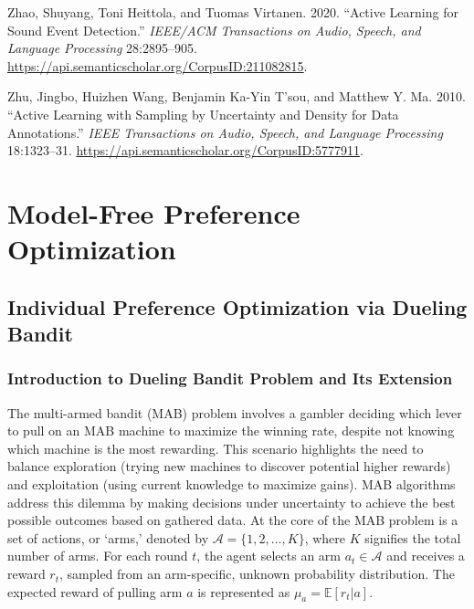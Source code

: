 \documentclass[
  letterpaper,
  numbers=noenddot,
  DIV=11]{scrreprt}
\newlength{\cslhangindent}
\newenvironment{CSLReferences}[2] %
 {\begin{list}{}{%
  \setlength{\itemindent}{0pt}
  \setlength{\leftmargin}{0pt}
  \setlength{\parsep}{0pt}
  \ifodd #1
   \setlength{\leftmargin}{\cslhangindent}
   \setlength{\itemindent}{-1\cslhangindent}
  \fi
  \setlength{\itemsep}{#2\baselineskip}}}
 {\end{list}}
\let\oldchapter\chapter
\def\chapter{%
  \setcounter{sidenote}{1}%
  \oldchapter
}
\theoremstyle{plain}
\theoremstyle{definition}
\theoremstyle{plain}
\theoremstyle{remark}
\begin{document}
\begin{CSLReferences}{1}{0}
Zhao, Shuyang, Toni Heittola, and Tuomas Virtanen. 2020. {``Active
Learning for Sound Event Detection.''} \emph{IEEE/ACM Transactions on
Audio, Speech, and Language Processing} 28:2895--905.
\url{https://api.semanticscholar.org/CorpusID:211082815}.

Zhu, Jingbo, Huizhen Wang, Benjamin Ka-Yin T'sou, and Matthew Y. Ma.
2010. {``Active Learning with Sampling by Uncertainty and Density for
Data Annotations.''} \emph{IEEE Transactions on Audio, Speech, and
Language Processing} 18:1323--31.
\url{https://api.semanticscholar.org/CorpusID:5777911}.

\end{CSLReferences}


\chapter{Model-Free Preference Optimization}\label{sec-model-free}

\section{Individual Preference Optimization via Dueling
Bandit}\label{individual-preference-optimization-via-dueling-bandit}

\subsection{Introduction to Dueling Bandit Problem and Its
Extension}\label{introduction-to-dueling-bandit-problem-and-its-extension}

The multi-armed bandit (MAB) problem involves a gambler deciding which
lever to pull on an MAB machine to maximize the winning rate, despite
not knowing which machine is the most rewarding. This scenario
highlights the need to balance exploration (trying new machines to
discover potential higher rewards) and exploitation (using current
knowledge to maximize gains). MAB algorithms address this dilemma by
making decisions under uncertainty to achieve the best possible outcomes
based on gathered data. At the core of the MAB problem is a set of
actions, or `arms,' denoted by \(\mathcal{A} = \{1, 2, \ldots, K\}\),
where \(K\) signifies the total number of arms. For each round \(t\),
the agent selects an arm \(a_t \in \mathcal{A}\) and receives a reward
\(r_t\), sampled from an arm-specific, unknown probability distribution.
The expected reward of pulling arm \(a\) is represented as
\(\mu_a = \mathbb{E}[r_t | a]\).
\end{document}
